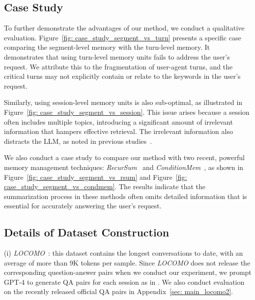 

\subsection{Case Study}
\label{sec: case_study}

To further demonstrate the advantages of our method, we conduct a qualitative evaluation. Figure~\ref{fig: case_study_segment_vs_turn} presents a specific case comparing the segment-level memory with the turn-level memory. It demonstrates that using turn-level memory units fails to address the user's request. We attribute this to the fragmentation of user-agent turns, and the critical turns may not explicitly contain or relate to the keywords in the user's request.

Similarly, using session-level memory units is also sub-optimal, as illustrated in Figure~\ref{fig: case_study_segment_vs_session}. This issue arises because a session often includes multiple topics, introducing a significant amount of irrelevant information that hampers effective retrieval. The irrelevant information also distracts the LLM, as noted in previous studies~\citep{shi2023large, liu2024lost}. 

We also conduct a case study to compare our method with two recent, powerful memory management techniques: \textit{RecurSum}~\citep{wang2023recursively} and \textit{ConditionMem}~\citep{yuan2023evolving}, as shown in Figure~\ref{fig: case_study_segment_vs_rsum} and Figure~\ref{fig: case_study_segment_vs_condmem}. The results indicate that the summarization process in these methods often omits detailed information that is essential for accurately answering the user's request.



\subsection{Details of Dataset Construction}
\label{sec: dataset_details}

(i) \textit{LOCOMO}~\citep{maharana2024evaluating}: this dataset contains the longest conversations to date, with an average of  more than 9K tokens per sample. Since \textit{LOCOMO} does not release the corresponding question-answer pairs when we conduct our experiment, we prompt GPT-4 to generate QA pairs for each session as in \citet{alonso2024toward}. We also conduct evaluation on the recently released official QA pairs in Appendix~\ref{sec: main_locomo2}.


